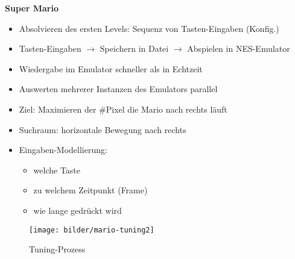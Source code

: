 \begin{frame}
  \textbf{Super Mario}
   
   \begin{itemize}
   
    \item Absolvieren des ersten Levels: Sequenz von Tasten-Eingaben (Konfig.)
    
    
    \item Tasten-Eingaben $\rightarrow$ Speichern in Datei $\rightarrow$ Abspielen in NES-Emulator
    
    \item Wiedergabe im Emulator schneller als in Echtzeit
    \item Auswerten mehrerer Instanzen des Emulators parallel
    
    \text{}
    
    \item Ziel: Maximieren der \#Pixel die Mario nach rechts läuft
    
    \item Suchraum: horizontale Bewegung nach rechts
    
    \item Eingaben-Modellierung:
      \begin{itemize}
        \item welche Taste
        \item zu welchem Zeitpunkt (Frame)
        \item wie lange gedrückt wird
      \end{itemize}
    \end{itemize}
   \end{frame}
\endgroup

 \begingroup
  \begin{frame}
  
  \begin{figure}
    \centering\texttt{[image: bilder/mario-tuning2]}
    \caption{Tuning-Prozess}
  \end{figure} 
  \end{frame}
  \endgroup
  

